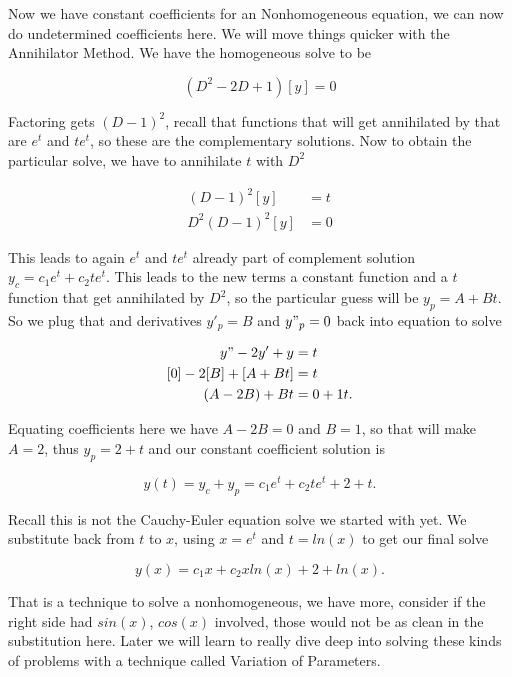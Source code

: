 \documentclass[12pt]{article}
\begin{document}
Now we have constant coefficients for an Nonhomogeneous equation, we can now do undetermined coefficients here. We will move things quicker with the Annihilator Method. We have the homogeneous solve to be

\begin{equation*}
    (D^2-2D+1)[y]=0
\end{equation*}

Factoring gets $(D-1)^2$, recall that functions that will get annihilated by that are $e^t$ and $te^t$, so these are the complementary solutions. Now to obtain the particular solve, we have to annihilate $t$ with $D^2$

\begin{align*}
    (D-1)^2[y]&=t \\
    D^2(D-1)^2[y]&=0
\end{align*}

This leads to again $e^t$ and $te^t$ already part of complement solution $y_c=c_1e^t+c_2te^t$. This leads to the new terms a constant function and a $t$ function that get annihilated by $D^2$, so the particular guess will be $y_p=A+Bt$. \\

So we plug that and derivatives $y'_p=B$ and $y"_p=0$ back into equation to solve

\begin{align*}
    y"-2y'+y&=t \\
    [0]-2[B]+[A+Bt]&=t \\
    (A-2B)+Bt&=0+1t.
\end{align*}

Equating coefficients here we have $A-2B=0$ and $B=1$, so that will make $A=2$, thus $y_p=2+t$ and our constant coefficient solution is

\begin{equation*}
    y(t)=y_c+y_p=c_1e^t+c_2te^t+2+t.
\end{equation*}

Recall this is not the Cauchy-Euler equation solve we started with yet. We substitute back from $t$ to $x$, using $x=e^t$ and $t=ln(x)$ to get our final solve

\begin{equation*}
    y(x)=c_1x+c_2xln(x)+2+ln(x).
\end{equation*}

That is a technique to solve a nonhomogeneous, we have more, consider if the right side had $sin(x)$, $cos(x)$ involved, those would not be as clean in the substitution here. Later we will learn to really dive deep into solving these kinds of problems with a technique called Variation of Parameters.
\end{document}
